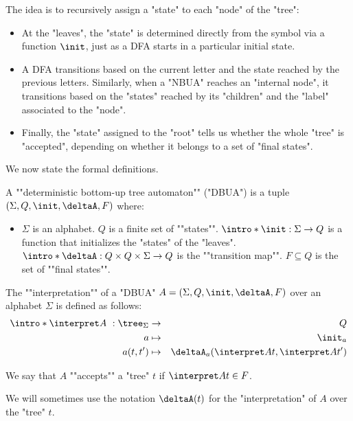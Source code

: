 \documentclass[a4paper,UKenglish,cleveref, autoref, thm-restate]{lipics-v2021}
\begin{document}
The idea is to recursively assign a "state" to each "node" of the "tree":
\begin{itemize}
	\item At the "leaves", the "state" is determined directly from the symbol via a function $\init$, just as a DFA starts in a particular initial state.
	\item A DFA transitions based on the current letter and the state reached by the previous letters.
	     Similarly, when a "NBUA" reaches an "internal node", it transitions based on the "states" reached by its "children" and the "label" associated to the "node".
	\item Finally, the "state" assigned to the "root" tells us whether the whole "tree" is "accepted",
	      depending on whether it belongs to a set of "final states".
\end{itemize}

We now state the formal definitions.

\begin{definition}
	\AP A ""deterministic bottom-up tree automaton"" (\reintro*"DBUA") is a tuple $(\Sigma, Q, \init, \deltaA, F)$ where:
	\begin{itemize}
		\item $\Sigma$ is an alphabet.
		      \itemAP $Q$ is a finite set of ""states"".
		      \itemAP $\intro*\init : \Sigma \to Q$ is a function that initializes the "states" of the "leaves".
		      \itemAP $\intro*\deltaA : Q \times Q \times \Sigma \to Q$ is the ""transition map"".
		      \itemAP $F \subseteq Q$ is the set of ""final states"".
	\end{itemize}
\end{definition}

\begin{definition}
	\AP The ""interpretation"" of a "DBUA" $A = (\Sigma, Q, \init, \deltaA, F)$  over an alphabet $\Sigma$ is defined as follows:
	\begin{eqnarray*}
		\intro* \interpret A ~: \tree_{\Sigma} &\to& Q \\
		a &\mapsto& \init_a \\
		a(t,t') &\mapsto& \deltaA_a (\interpret A t, \interpret A {t'})
	\end{eqnarray*}

	We say that $A$ ""accepts"" a "tree" $t$ if $\interpret A t \in F$.

	We will sometimes use the notation $\deltaA(t)$ for the "interpretation" of $A$ over the "tree" $t$.
\end{definition}
\end{document}
